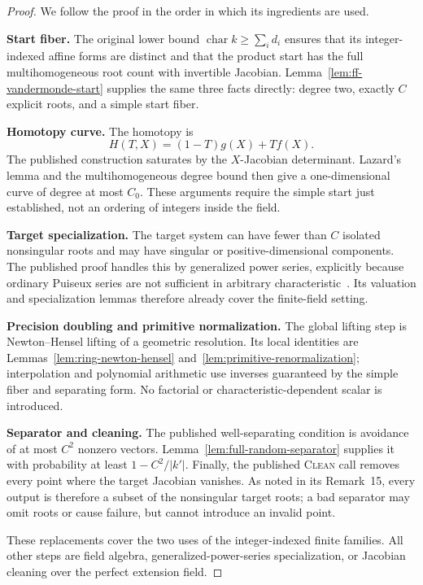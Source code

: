 \documentclass[11pt,a4paper]{article}
\theoremstyle{definition}
\theoremstyle{remark}
\newcommand{\proofstep}[1]{\par\smallskip\noindent\textbf{#1}\enspace}
\begin{document}
\begin{proof}
We follow the proof in the order in which its ingredients are used.

\proofstep{Start fiber.}
The original lower bound
$\operatorname{char}k\ge\sum_i d_i$ ensures that its integer-indexed affine forms are distinct and that the product start has the full multihomogeneous root count with invertible Jacobian.  Lemma~\ref{lem:ff-vandermonde-start} supplies the same three facts directly: degree two, exactly $C$ explicit roots, and a simple start fiber.

\proofstep{Homotopy curve.}
The homotopy is
\[
 H(T,X)=(1-T)g(X)+Tf(X).
\]
The published construction saturates by the $X$-Jacobian determinant.  Lazard's lemma and the multihomogeneous degree bound then give a one-dimensional curve of degree at most $C_0$.  These arguments require the simple start just established, not an ordering of integers inside the field.

\proofstep{Target specialization.}
The target system can have fewer than $C$ isolated nonsingular roots and may have singular or positive-dimensional components.  The published proof handles this by generalized power series, explicitly because ordinary Puiseux series are not sufficient in arbitrary characteristic~\cite[Sec.~3.4]{SafeySchost2018}.  Its valuation and specialization lemmas therefore already cover the finite-field setting.

\proofstep{Precision doubling and primitive normalization.}
The global lifting step is Newton--Hensel lifting of a geometric resolution.  Its local identities are Lemmas~\ref{lem:ring-newton-hensel} and~\ref{lem:primitive-renormalization}; interpolation and polynomial arithmetic use inverses guaranteed by the simple fiber and separating form.  No factorial or characteristic-dependent scalar is introduced.

\proofstep{Separator and cleaning.}
The published well-separating condition is avoidance of at most $C^2$ nonzero vectors.  Lemma~\ref{lem:full-random-separator} supplies it with probability at least $1-C^2/|k'|$.  Finally, the published \textsc{Clean} call removes every point where the target Jacobian vanishes.  As noted in its Remark~15, every output is therefore a subset of the nonsingular target roots; a bad separator may omit roots or cause failure, but cannot introduce an invalid point.

These replacements cover the two uses of the integer-indexed finite families.  All other steps are field algebra, generalized-power-series specialization, or Jacobian cleaning over the perfect extension field.
\end{proof}
\end{document}
